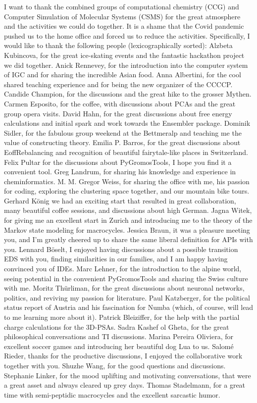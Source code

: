 I want to thank the combined groups of computational chemistry (CCG) and Computer Simulation of Molecular Systems (CSMS) for the great atmosphere and the activities we could do together. It is a shame that the Covid pandemic pushed us to the home office and forced us to reduce the activities.
Specifically, I would like to thank the following people (lexicographically sorted):
Alzbeta Kubincova, for the great ice-skating events and the fantastic hackathon project we did together.
Anick Rennevey, for the introduction into the computer system of IGC and for sharing the incredible Asian food.
Anna Albertini, for the cool shared teaching experience and for being the new organizer of the CCCCP.
Candide Champion, for the discussions and the great hike to the grosser Mythen.
Carmen Esposito, for the coffee, with discussions about PCAs and the great group opera visits.
David Hahn, for the great discussions about free energy calculations and initial spark and work towards the Ensembler package.
Dominik Sidler, for the fabulous group weekend at the Bettmeralp and teaching me the value of constructing theory.
Emilia P. Barros, for the great discussions about EoffRebalancing and recognition of beautiful fairytale-like places in Switzerland.
Felix Pultar for the discussions about PyGromosTools, I hope you find it a convenient tool.
Greg Landrum, for sharing his knowledge and experience in cheminformatics.
M. M. Gregor Weiss, for sharing the office with me, his passion for coding, exploring the clustering space together, and our mountain bike tours.
Gerhard K{\"o}nig we had an exciting start that resulted in great collaboration, many beautiful coffee sessions, and discussions about high German.
Jagna Witek, for giving me an excellent start in Zurich and introducing me to the theory of the Markov state modeling for macrocycles.
Jessica Braun, it was a pleasure meeting you, and I'm greatly cheered up to share the same liberal definition for APIs with you.
Lennard B{\"o}selt, I enjoyed having discussions about a possible transition EDS with you, finding similarities in our families, and I am happy having convinced you of IDEs.
Marc Lehner, for the introduction to the alpine world, seeing potential in the convenient PyGromosTools and sharing the Swiss culture with me.
Moritz Th{\"u}rliman, for the great discussions about neuronal networks, politics, and reviving my passion for literature.
Paul Katzberger, for the political status report of Austria and his fascination for Numba (which, of course, will lead to me learning more about it).
Patrick Bleiziffer, for the help with the partial charge calculations for the 3D-PSAs.
Sadra Kashef ol Gheta, for the great philosophical conversations and TI discussions.
Marina Pereira Oliviera, for excellent soccer games and introducing her beautiful dog Lua to us.
Salom{\'e} Rieder, thanks for the productive discussions, I enjoyed the collaborative work together with you.
Shuzhe Wang, for the good questions and discussions.
Stephanie Linker, for the mood uplifting and motivating conversations, that were a great asset and always cleared up grey days.
Thomas Stadelmann, for a great time with semi-peptidic macrocycles and the excellent sarcastic humor.



